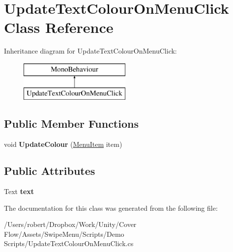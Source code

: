 \hypertarget{class_update_text_colour_on_menu_click}{}\section{Update\+Text\+Colour\+On\+Menu\+Click Class Reference}
\label{class_update_text_colour_on_menu_click}
Inheritance diagram for Update\+Text\+Colour\+On\+Menu\+Click\+:\begin{figure}[H]
\begin{center}
\leavevmode
\includegraphics[height=2.000000cm]{class_update_text_colour_on_menu_click}
\end{center}
\end{figure}
\subsection*{Public Member Functions}
\begin{DoxyCompactItemize}
\item 
\hypertarget{class_update_text_colour_on_menu_click_a734eb5afae82132cdd4d8027cec90ab4}{}void {\bfseries Update\+Colour} (\hyperlink{class_swipe_menu_1_1_menu_item}{Menu\+Item} item)\label{class_update_text_colour_on_menu_click_a734eb5afae82132cdd4d8027cec90ab4}

\end{DoxyCompactItemize}
\subsection*{Public Attributes}
\begin{DoxyCompactItemize}
\item 
\hypertarget{class_update_text_colour_on_menu_click_af71b6a29f19579340b0eedebfb304501}{}Text {\bfseries text}\label{class_update_text_colour_on_menu_click_af71b6a29f19579340b0eedebfb304501}

\end{DoxyCompactItemize}


The documentation for this class was generated from the following file\+:\begin{DoxyCompactItemize}
\item 
/\+Users/robert/\+Dropbox/\+Work/\+Unity/\+Cover Flow/\+Assets/\+Swipe\+Menu/\+Scripts/\+Demo Scripts/Update\+Text\+Colour\+On\+Menu\+Click.\+cs\end{DoxyCompactItemize}

